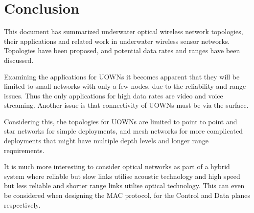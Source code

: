 \section{Conclusion}
This document has summarized underwater optical wireless network
topologies, their applications and related work in underwater wireless sensor
networks. Topologies have been proposed, and potential data rates and ranges
have been discussed.

Examining the applications for \ac{UOWN}s it becomes apparent that they will
be limited to small networks with only a few nodes, due to the reliability and
range issues. Thus the only applications for high data rates are video and
voice streaming. Another issue is that connectivity of \ac{UOWN}s must be
via the surface.

Considering this, the topologies for \ac{UOWN}s are limited to point to point
and star networks for simple deployments, and mesh networks for more complicated
deployments that might have multiple depth levels and longer range requirements.

It is much more interesting to consider optical networks as part of a hybrid
system where reliable but slow links utilise acoustic technology and high speed
but less reliable and shorter range links utilise optical technology. This can
even be considered when designing the \ac{MAC} protocol, for the Control and
Data planes respectively.